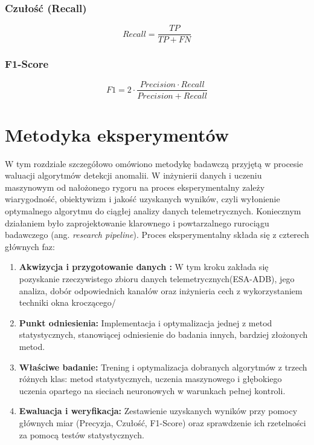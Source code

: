 \documentclass[a4paper,twoside,12pt]{book}
\newcommand{\obcy}[1]{\emph{#1}}
\newcommand{\english}[1]{{\selectlanguage{british}\obcy{#1}}}
\begin{document}
\subsection{Czułość (Recall)}


\begin{equation}
	Recall = \frac{TP}{TP + FN}
	\label{eq:recall}
\end{equation} 
\cite{sathyanarayanan2024confusion}

\subsection{F1-Score}

\begin{equation}
	F1 = 2 \cdot \frac{Precision \cdot Recall}{Precision + Recall}
	\label{eq:f1score}
\end{equation}

\cite{sathyanarayanan2024confusion}


\chapter{Metodyka eksperymentów} 

W tym rozdziale szczegółowo omówiono metodykę badawczą przyjętą w procesie waluacji algorytmów detekcji anomalii. W inżynierii danych i uczeniu maszynowym od nałożonego rygoru na proces eksperymentalny zależy wiarygodność, obiektywizm i jakość uzyskanych wyników, czyli wyłonienie optymalnego algorytmu do ciągłej analizy danych telemetrycznych. Koniecznym działaniem było zaprojektowanie klarownego i powtarzalnego rurociągu badawczego (ang. \english{research pipeline}).
Proces eksperymentalny składa się z czterech głównych faz:
\begin{enumerate}
	\item \textbf{Akwizycja i przygotowanie danych :} W tym kroku zakłada się pozyskanie rzeczywistego zbioru danych telemetrycznych(ESA-ADB), jego analiza, dobór odpowiednich kanałów oraz inżynieria cech z wykorzystaniem techniki okna kroczącego/
	\item \textbf {Punkt odniesienia:} Implementacja i optymalizacja jednej z metod statystycznych, stanowiącej odniesienie do badania innych, bardziej złożonych metod.
	\item \textbf{Właściwe badanie:} Trening i optymalizacja dobranych algorytmów z trzech różnych klas: metod statystycznych, uczenia maszynowego i głębokiego uczenia opartego na sieciach neuronowych w warunkach pełnej kontroli.
	\item \textbf {Ewaluacja i weryfikacja:} Zestawienie uzyskanych wyników przy pomocy głównych miar (Precyzja, Czułość, F1-Score) oraz sprawdzenie ich rzetelności za pomocą testów statystycznych.
\end{enumerate}
\end{document}
